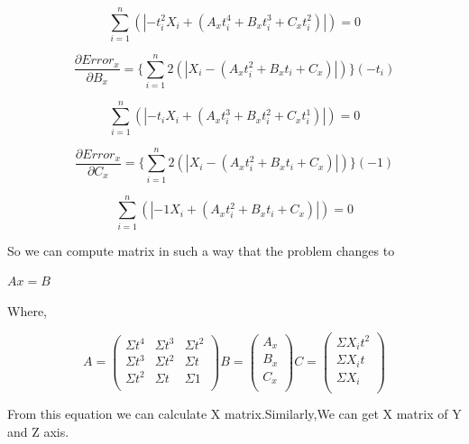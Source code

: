 \begin{equation} 
\displaystyle\sum_{i=1}^{n}(|{-t_i^2}X_i+(A_x t_i^4+B_x t_i^3+C_x t_i^2)|) = 0
\end{equation}

\begin{equation} 
 \frac{\partial Error_x}{\partial B_x} = {\lbrace\displaystyle\sum_{i=1}^{n}2(|X_i-(A_xt_i^2+B_x t_i +C_x)|)\rbrace}({-t_i})
\end{equation}

\begin{equation} 
\displaystyle\sum_{i=1}^{n}(|{-t_i}X_i+(A_x t_i^3+B_x t_i^2+C_x t_i^1)|) = 0
\end{equation}

\begin{equation} 
 \frac{\partial Error_x}{\partial C_x} = {\lbrace\displaystyle\sum_{i=1}^{n}2(|X_i-(A_xt_i^2+B_x t_i +C_x)|)\rbrace}({-1})
\end{equation}

\begin{equation} 
\displaystyle\sum_{i=1}^{n}(|{-1}X_i+(A_x t_i^2+B_x t_i+C_x)|) = 0
\end{equation}

So we can compute matrix in such a way that the problem changes to 

$Ax=B$

Where, 

\begin{equation}
A = 
\begin{pmatrix}
  \Sigma t^4 & \Sigma t^3 & \Sigma t^2\\
  \Sigma t^3 & \Sigma t^2 & \Sigma t\\
  \Sigma t^2 & \Sigma t & \Sigma 1\\
 \end{pmatrix}
B = 
\begin{pmatrix}
  A_x \\
  B_x \\
  C_x \\
 \end{pmatrix}
 C = 
\begin{pmatrix}
  \Sigma X_i t ^2 \\
  \Sigma X_i t \\
  \Sigma X_i \\
 \end{pmatrix}
\end{equation}

From this equation we can calculate X matrix.Similarly,We can get X matrix of Y and Z axis.

